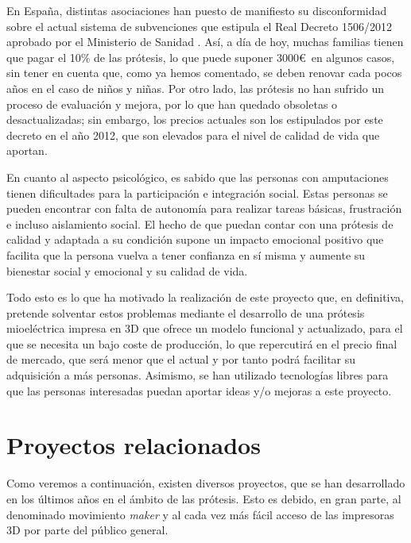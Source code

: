 En España, distintas asociaciones han puesto de manifiesto su disconformidad
sobre el actual sistema de subvenciones que estipula el Real Decreto 1506/2012
aprobado por el Ministerio de Sanidad \cite{boe}. Así, a día de hoy, muchas familias tienen
que pagar el 10\% de las prótesis, lo que puede suponer 3000\euro~en algunos casos,
sin tener en cuenta que, como ya hemos comentado, se deben renovar cada pocos
años en el caso de niños y niñas. Por otro lado, las prótesis no han sufrido un
proceso de evaluación y mejora, por lo que han quedado obsoletas o
desactualizadas; sin embargo, los precios actuales son los estipulados por este
decreto en el año 2012, que son elevados para el nivel de calidad de vida que
aportan.


En cuanto al aspecto psicológico, es sabido que las personas con amputaciones
tienen dificultades para la participación e integración social. Estas personas
se pueden encontrar con falta de autonomía para realizar tareas básicas,
frustración e incluso aislamiento social. El hecho de que puedan contar con una
prótesis de calidad y adaptada a su condición supone un impacto emocional
positivo que facilita que la persona vuelva a tener confianza en sí misma y
aumente su bienestar social y emocional y su calidad de vida.

Todo esto es lo que ha motivado la realización de este proyecto que, en
definitiva, pretende solventar estos problemas mediante el desarrollo de una
prótesis mioeléctrica impresa en 3D que ofrece un modelo funcional y
actualizado, para el que se necesita un bajo coste de producción, lo que
repercutirá en el precio final de mercado, que será menor que el actual y por
tanto podrá facilitar su adquisición a más personas. Asimismo, se han utilizado
tecnologías libres para que las personas interesadas puedan aportar ideas y/o mejoras a este proyecto.




%
%
%
%

\section{Proyectos relacionados}
\label{sec:proyectos_relacionados}

Como veremos a continuación, existen diversos proyectos, que se han desarrollado
en los últimos años en el ámbito de las prótesis. Esto es debido, en gran parte,
al denominado movimiento \textit{maker} y al cada vez más fácil acceso de las
impresoras 3D por parte del público general.

